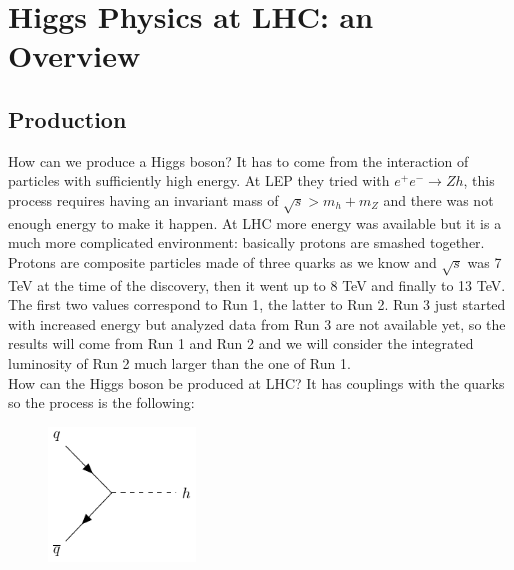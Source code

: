\documentclass[../main.tex]{subfiles}
\begin{document}
\section{Higgs Physics at LHC: an Overview}
\subsection{Production}
How can we produce a Higgs boson? It has to come from the interaction of particles with sufficiently high energy. At LEP they tried with $e^+e^-\to Zh$,
this process requires having an invariant mass of $\sqrt{s}>m_h+m_Z$ and there was not enough energy to make it happen. At LHC more energy was available but it is a much more complicated environment: basically protons are smashed together. Protons are composite particles made of three quarks as we know and $\sqrt{s}$ was 7 TeV at the time of the discovery, then it went up to 8 TeV and finally to 13 TeV. The first two values correspond to Run 1, the latter to Run 2. Run 3 just started with increased energy but analyzed data from Run 3 are not available yet, so the results will come from Run 1 and Run 2 and we will consider the integrated luminosity of Run 2 much larger than the one of Run 1.\\
How can the Higgs boson be produced at LHC? It has couplings with the quarks so the process is the following:
\begin{figure}[h]
    \centering
    \includegraphics[width=0.35\textwidth]{Images/qqhiggs.pdf}
    \caption*{}
\end{figure}\\
\end{document}
